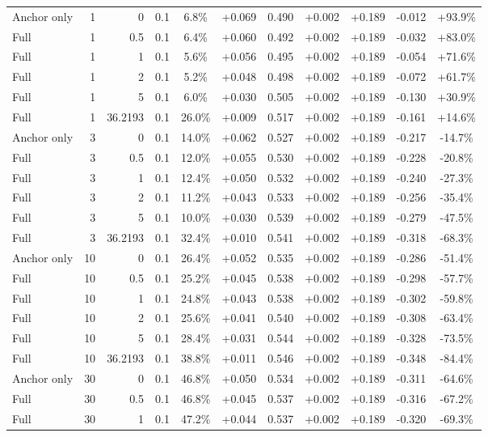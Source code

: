 \begin{table}[htbp]
\begin{tabular}{lrrrccccccc}
Anchor only & 1 & 0 & 0.1 & 6.8\% & +0.069 & 0.490 & +0.002 & +0.189 & -0.012 & +93.9\% \\
Full & 1 & 0.5 & 0.1 & 6.4\% & +0.060 & 0.492 & +0.002 & +0.189 & -0.032 & +83.0\% \\
Full & 1 & 1 & 0.1 & 5.6\% & +0.056 & 0.495 & +0.002 & +0.189 & -0.054 & +71.6\% \\
Full & 1 & 2 & 0.1 & 5.2\% & +0.048 & 0.498 & +0.002 & +0.189 & -0.072 & +61.7\% \\
Full & 1 & 5 & 0.1 & 6.0\% & +0.030 & 0.505 & +0.002 & +0.189 & -0.130 & +30.9\% \\
Full & 1 & 36.2193 & 0.1 & 26.0\% & +0.009 & 0.517 & +0.002 & +0.189 & -0.161 & +14.6\% \\
Anchor only & 3 & 0 & 0.1 & 14.0\% & +0.062 & 0.527 & +0.002 & +0.189 & -0.217 & -14.7\% \\
Full & 3 & 0.5 & 0.1 & 12.0\% & +0.055 & 0.530 & +0.002 & +0.189 & -0.228 & -20.8\% \\
Full & 3 & 1 & 0.1 & 12.4\% & +0.050 & 0.532 & +0.002 & +0.189 & -0.240 & -27.3\% \\
Full & 3 & 2 & 0.1 & 11.2\% & +0.043 & 0.533 & +0.002 & +0.189 & -0.256 & -35.4\% \\
Full & 3 & 5 & 0.1 & 10.0\% & +0.030 & 0.539 & +0.002 & +0.189 & -0.279 & -47.5\% \\
Full & 3 & 36.2193 & 0.1 & 32.4\% & +0.010 & 0.541 & +0.002 & +0.189 & -0.318 & -68.3\% \\
Anchor only & 10 & 0 & 0.1 & 26.4\% & +0.052 & 0.535 & +0.002 & +0.189 & -0.286 & -51.4\% \\
Full & 10 & 0.5 & 0.1 & 25.2\% & +0.045 & 0.538 & +0.002 & +0.189 & -0.298 & -57.7\% \\
Full & 10 & 1 & 0.1 & 24.8\% & +0.043 & 0.538 & +0.002 & +0.189 & -0.302 & -59.8\% \\
Full & 10 & 2 & 0.1 & 25.6\% & +0.041 & 0.540 & +0.002 & +0.189 & -0.308 & -63.4\% \\
Full & 10 & 5 & 0.1 & 28.4\% & +0.031 & 0.544 & +0.002 & +0.189 & -0.328 & -73.5\% \\
Full & 10 & 36.2193 & 0.1 & 38.8\% & +0.011 & 0.546 & +0.002 & +0.189 & -0.348 & -84.4\% \\
Anchor only & 30 & 0 & 0.1 & 46.8\% & +0.050 & 0.534 & +0.002 & +0.189 & -0.311 & -64.6\% \\
Full & 30 & 0.5 & 0.1 & 46.8\% & +0.045 & 0.537 & +0.002 & +0.189 & -0.316 & -67.2\% \\
Full & 30 & 1 & 0.1 & 47.2\% & +0.044 & 0.537 & +0.002 & +0.189 & -0.320 & -69.3\% \\

\end{tabular}
\end{table}
